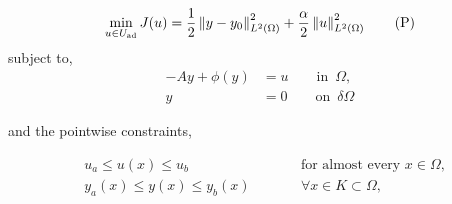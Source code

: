 \begin{equation}
	\min_{u\in U_{\mathrm{ad}}} J(u)=\frac{1}{2} \left\lVert y-y_0 \right\rVert^2_{L^2(\Omega)}+\frac{\alpha}{2}\left\lVert u \right\rVert^2_{L^2(\Omega)} \tag{P}	
\end{equation}
subject to,
\begin{align}
	-Ay+\phi(y) &= u \qquad \text{in }\, \Omega,\\
	y &= 0 \qquad \text{on }\, \delta \Omega
\end{align}

and the pointwise constraints,

\begin{align}
 	&u_a\leq u(x)\leq u_b & \qquad &\text{for almost every } x \in \Omega,  \\
   &y_a(x)\leq y(x)\leq y_b(x) & \qquad 	&\forall x \in K \subset \Omega,
\end{align}